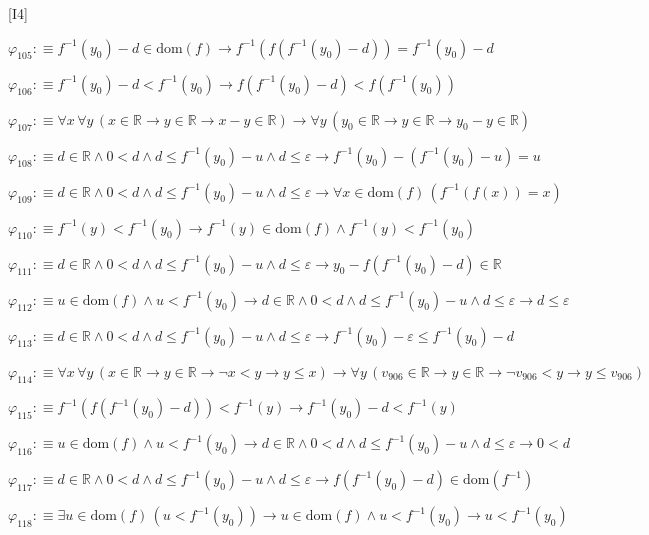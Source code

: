 \begin{fullproof}{[I4]}
\begin{abbrevlist}
\item $\varphi_{105} :\equiv f^{-1}(y_{0}) - d \in \mathrm{dom}(f) \to f^{-1}(f(f^{-1}(y_{0}) - d)) = f^{-1}(y_{0}) - d$
\item $\varphi_{106} :\equiv f^{-1}(y_{0}) - d < f^{-1}(y_{0}) \to f(f^{-1}(y_{0}) - d) < f(f^{-1}(y_{0}))$
\item $\varphi_{107} :\equiv \forall x\,\forall y\,(x \in \mathbb{R} \to y \in \mathbb{R} \to x - y \in \mathbb{R}) \to \forall y\,(y_{0} \in \mathbb{R} \to y \in \mathbb{R} \to y_{0} - y \in \mathbb{R})$
\item $\varphi_{108} :\equiv d \in \mathbb{R} \land 0 < d \land d \leq f^{-1}(y_{0}) - u \land d \leq \varepsilon \to f^{-1}(y_{0}) - (f^{-1}(y_{0}) - u) = u$
\item $\varphi_{109} :\equiv d \in \mathbb{R} \land 0 < d \land d \leq f^{-1}(y_{0}) - u \land d \leq \varepsilon \to \forall x \in \mathrm{dom}(f)\,(f^{-1}(f(x)) = x)$
\item $\varphi_{110} :\equiv f^{-1}(y) < f^{-1}(y_{0}) \to f^{-1}(y) \in \mathrm{dom}(f) \land f^{-1}(y) < f^{-1}(y_{0})$
\item $\varphi_{111} :\equiv d \in \mathbb{R} \land 0 < d \land d \leq f^{-1}(y_{0}) - u \land d \leq \varepsilon \to y_{0} - f(f^{-1}(y_{0}) - d) \in \mathbb{R}$
\item $\varphi_{112} :\equiv u \in \mathrm{dom}(f) \land u < f^{-1}(y_{0}) \to d \in \mathbb{R} \land 0 < d \land d \leq f^{-1}(y_{0}) - u \land d \leq \varepsilon \to d \leq \varepsilon$
\item $\varphi_{113} :\equiv d \in \mathbb{R} \land 0 < d \land d \leq f^{-1}(y_{0}) - u \land d \leq \varepsilon \to f^{-1}(y_{0}) - \varepsilon \leq f^{-1}(y_{0}) - d$
\item $\varphi_{114} :\equiv \forall x\,\forall y\,(x \in \mathbb{R} \to y \in \mathbb{R} \to \neg x < y \to y \leq x) \to \forall y\,(v_{906} \in \mathbb{R} \to y \in \mathbb{R} \to \neg v_{906} < y \to y \leq v_{906})$
\item $\varphi_{115} :\equiv f^{-1}(f(f^{-1}(y_{0}) - d)) < f^{-1}(y) \to f^{-1}(y_{0}) - d < f^{-1}(y)$
\item $\varphi_{116} :\equiv u \in \mathrm{dom}(f) \land u < f^{-1}(y_{0}) \to d \in \mathbb{R} \land 0 < d \land d \leq f^{-1}(y_{0}) - u \land d \leq \varepsilon \to 0 < d$
\item $\varphi_{117} :\equiv d \in \mathbb{R} \land 0 < d \land d \leq f^{-1}(y_{0}) - u \land d \leq \varepsilon \to f(f^{-1}(y_{0}) - d) \in \mathrm{dom}(f^{-1})$
\item $\varphi_{118} :\equiv \exists u \in \mathrm{dom}(f)\,(u < f^{-1}(y_{0})) \to u \in \mathrm{dom}(f) \land u < f^{-1}(y_{0}) \to u < f^{-1}(y_{0})$

\end{abbrevlist}
\end{fullproof}
